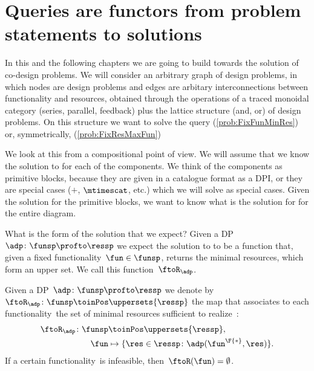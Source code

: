 \section{Queries are functors from problem statements to solutions}

\publictodomessage

In this and the following chapters we are going to build towards the solution of co-design problems.
We will consider an arbitrary graph of design problems, in which nodes are design problems and edges are arbitary interconnections between functionality and resources, obtained through the operations of a traced monoidal category (series, parallel, feedback) plus the lattice structure (and, or) of design problems.
On this structure we want to solve the query \FixFunMinRes (\cref{prob:FixFunMinRes}) or, symmetrically, \FixResMaxFun (\cref{prob:FixResMaxFun})

We look at this from a compositional point of view.
We will assume that we know the solution to \FixFunMinRes for each of the components.
We think of the components as primitive blocks, because they are given in a catalogue format as a DPI, or they are special cases ($+$, $\mtimescat$, etc.) which we will solve as special cases.
Given the solution for the primitive blocks, we want to know what is the solution for \FixFunMinRes for the entire diagram.

What is the form of the solution that we expect?
Given a DP~$\adp\colon \funsp \profto \ressp$ we expect the solution to \FixFunMinRes to be a function that, given a fixed functionality~$\fun\in\funsp$, returns the minimal resources, which form an upper set.
We call this function~$\ftoR_\adp$.

\begin{definition}
    \label{def:ftoR-dp}
    Given a DP~$\adp\colon\funsp\profto\ressp$ we denote by~$\ftoR_{\adp}\colon \funsp\toinPos \uppersets{\ressp}$ the map that associates to each functionality~\fun the set of minimal resources sufficient to realize~\fun:
    \begin{equation*}
        \begin{aligned}
            \ftoR_{\adp}\colon \funsp & \toinPos \uppersets{\ressp},                                \\
            \fun                      & \mapsto \{ \res \in \ressp \colon \adp(\fun^\F{*}, \res)\}.
        \end{aligned}
    \end{equation*}
    If a certain functionality~\fun is infeasible, then~$\ftoR(\fun)=\emptyset$.
\end{definition}

